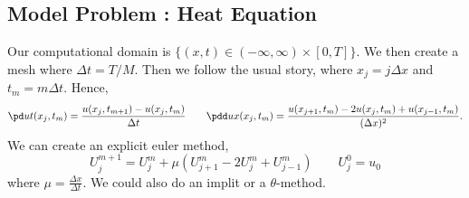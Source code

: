 \subsection{Model Problem : Heat Equation}
Our computational domain is $\{(x, t) \in (-\infty, \infty) \times [0, T]\}$. We then create a mesh where $\Delta t = T/M$. Then we follow the usual story, where $x_j = j\Delta x$ and $t_m = m\Delta t$. Hence,
$$ \pd u t (x_j, t_m) = \frac{u(x_j, t_{m+1}) - u(x_j, t_m)}{\Delta t} \qquad \pdd u x (x_j, t_m) = \frac{u(x_{j+1}, t_m) - 2u(x_j, t_m) + u(x_{j-1}, t_m)}{(\Delta x)^2}. $$
We can create an explicit euler method,
$$ U_j^{m+1} = U_j^m + \mu (U_{j+1}^m - 2U_j^m + U_{j-1}^m)  \qquad U_j^0 = u_0$$
where $\mu = \frac{\Delta x}{\Delta t}$. We could also do an implit or a $\theta$-method. 